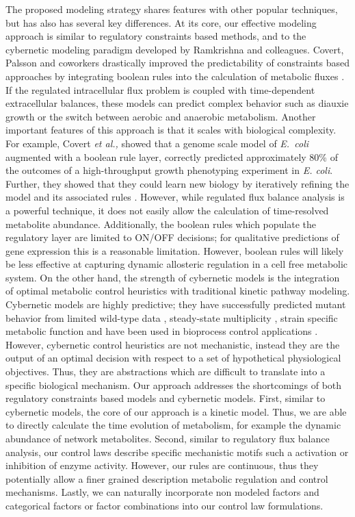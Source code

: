 \documentclass[12pt]{article}
\begin{document}
The proposed modeling strategy shares features with other popular techniques, but has also has several key differences. 
At its core, our effective modeling approach is similar to regulatory constraints based methods, and to the cybernetic modeling paradigm developed by Ramkrishna and colleagues.
Covert, Palsson and coworkers drastically improved the predictability of constraints based approaches by integrating boolean rules into the calculation of metabolic fluxes \citep{Covert:2001aa}.
If the regulated intracellular flux problem is coupled with time-dependent extracellular balances, these models can predict complex behavior such as diauxie growth or the switch between 
aerobic and anaerobic metabolism. Another important features of this approach is that it scales with biological complexity. 
For example, Covert \emph{et al.,} showed that a genome scale model of \emph{E.~coli} augmented with a boolean rule layer, 
correctly predicted approximately 80\% of the outcomes of a high-throughput growth phenotyping experiment in \emph{E. coli}.
Further, they showed that they could learn new biology by iteratively refining the model and its associated rules \citep{Covert:2004aa}. 
However, while regulated flux balance analysis is a powerful technique, it does not easily allow the calculation of time-resolved metabolite abundance. 
Additionally, the boolean rules which populate the regulatory layer are limited to ON/OFF decisions; for qualitative predictions of gene expression this is a reasonable limitation. 
However, boolean rules will likely be less effective at capturing dynamic allosteric regulation in a cell free metabolic system. 
On the other hand, the strength of cybernetic models is the integration of optimal metabolic control heuristics with traditional kinetic pathway modeling. 
Cybernetic models are highly predictive; they have successfully predicted mutant behavior from limited wild-type data \citep{1999_varner_ramkrishna_MetaEng,Varner:2000aa,Song:2012aa}, 
steady-state multiplicity \citep{2012_kim_ramkrishna_BiotechProg}, strain specific metabolic function \citep{Song:2011aa} and have been used in bioprocess control applications \citep{Gadkar:2003aa}.
However, cybernetic control heuristics are not mechanistic, instead they are the output of an optimal decision with respect to a set of hypothetical physiological objectives. 
Thus, they are abstractions which are difficult to translate into a specific biological mechanism. 
Our approach addresses the shortcomings of both regulatory constraints based models and cybernetic models. 
First, similar to cybernetic models, the core of our approach is a kinetic model. Thus, we are able to directly calculate the time evolution of metabolism, for example the dynamic abundance of 
network metabolites. Second, similar to regulatory flux balance analysis, our control laws describe specific mechanistic motifs such a activation or inhibition of enzyme activity. 
However, our rules are continuous, thus they potentially allow a finer grained description metabolic regulation and control mechanisms.
Lastly, we can naturally incorporate non modeled factors and categorical factors or factor combinations into our control law formulations.
\end{document}
